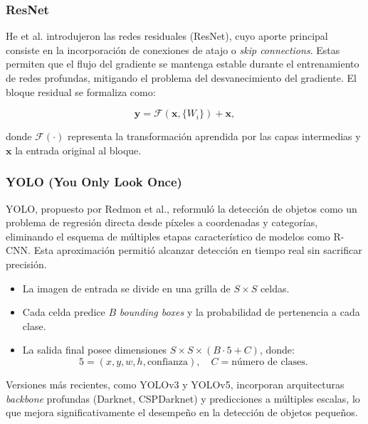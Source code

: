\subsubsection{ResNet}  
He et al. introdujeron las redes residuales (ResNet), cuyo aporte principal consiste en la incorporación de conexiones de atajo o \textit{skip connections}. Estas permiten que el flujo del gradiente se mantenga estable durante el entrenamiento de redes profundas, mitigando el problema del desvanecimiento del gradiente. El bloque residual se formaliza como:  

\[
\mathbf{y} = \mathcal{F}(\mathbf{x}, \{W_i\}) + \mathbf{x},
\]  

donde \(\mathcal{F}(\cdot)\) representa la transformación aprendida por las capas intermedias y \(\mathbf{x}\) la entrada original al bloque.  

\subsubsection{YOLO (You Only Look Once)}  
YOLO, propuesto por Redmon et al., reformuló la detección de objetos como un problema de regresión directa desde píxeles a coordenadas y categorías, eliminando el esquema de múltiples etapas característico de modelos como R-CNN. Esta aproximación permitió alcanzar detección en tiempo real sin sacrificar precisión.  

\begin{itemize}
    \item La imagen de entrada se divide en una grilla de $S \times S$ celdas.
    \item Cada celda predice $B$ \emph{bounding boxes} y la probabilidad de pertenencia a cada clase.
    \item La salida final posee dimensiones $S \times S \times (B \cdot 5 + C)$, donde:
    \[
    5 = (x, y, w, h, \text{confianza}), \quad C = \text{número de clases}.
    \]
\end{itemize}

Versiones más recientes, como YOLOv3 y YOLOv5, incorporan arquitecturas \textit{backbone} profundas (Darknet, CSPDarknet) y predicciones a múltiples escalas, lo que mejora significativamente el desempeño en la detección de objetos pequeños.  


